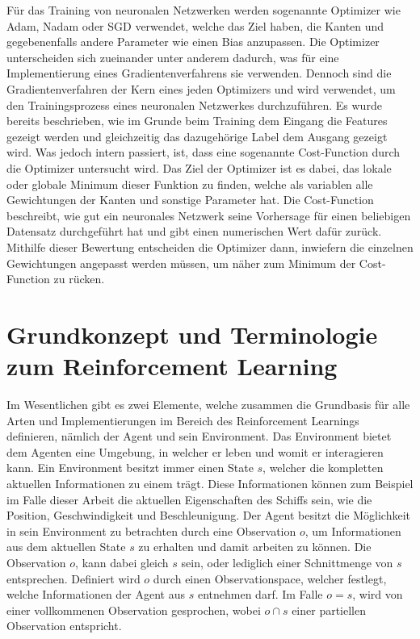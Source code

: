 \documentclass[]{iat}
\begin{document}
Für das Training von neuronalen Netzwerken werden sogenannte Optimizer wie Adam, Nadam oder SGD verwendet, welche das Ziel haben, die Kanten und gegebenenfalls andere Parameter wie einen Bias anzupassen. Die Optimizer unterscheiden sich zueinander unter anderem dadurch, was für eine Implementierung eines Gradientenverfahrens sie verwenden. Dennoch sind die Gradientenverfahren der Kern eines jeden Optimizers und wird verwendet, um den Trainingsprozess eines neuronalen Netzwerkes durchzuführen. Es wurde bereits beschrieben, wie im Grunde beim Training dem Eingang die Features gezeigt werden und gleichzeitig das dazugehörige Label dem Ausgang gezeigt wird. Was jedoch intern passiert, ist, dass eine sogenannte Cost-Function durch die Optimizer untersucht wird. Das Ziel der Optimizer ist es dabei, das lokale oder globale Minimum dieser Funktion zu finden, welche als variablen alle Gewichtungen der Kanten und sonstige Parameter hat. Die Cost-Function beschreibt, wie gut ein neuronales Netzwerk seine Vorhersage für einen beliebigen Datensatz durchgeführt hat und gibt einen numerischen Wert dafür zurück. Mithilfe dieser Bewertung entscheiden die Optimizer dann, inwiefern die einzelnen Gewichtungen angepasst werden müssen, um näher zum Minimum der Cost-Function zu rücken. \cite[]{KrusComp2015}

\newpage
\section{Grundkonzept und Terminologie zum Reinforcement Learning} \label{sec:grundkonzept_rf}
Im Wesentlichen gibt es zwei Elemente, welche zusammen die Grundbasis für alle Arten und Implementierungen im Bereich des Reinforcement Learnings definieren, nämlich der Agent und sein Environment. Das Environment bietet dem Agenten eine Umgebung, in welcher er leben und womit er interagieren kann. Ein Environment besitzt immer einen State $s$, welcher die kompletten aktuellen Informationen zu einem trägt. Diese Informationen können zum Beispiel im Falle dieser Arbeit die aktuellen Eigenschaften des Schiffs sein, wie die Position, Geschwindigkeit und Beschleunigung. Der Agent besitzt die Möglichkeit in sein Environment zu betrachten durch eine Observation $o$, um Informationen aus dem aktuellen State $s$ zu erhalten und damit arbeiten zu können. Die Observation $o$, kann dabei gleich $s$ sein, oder lediglich einer Schnittmenge von $s$ entsprechen. Definiert wird $o$ durch einen Observationspace, welcher festlegt, welche Informationen der Agent aus $s$ entnehmen darf. Im Falle $o=s$, wird von einer vollkommenen Observation gesprochen, wobei $o \cap s$ einer partiellen Observation entspricht. \cite[]{SpinningUp2018} \cite[]{Sutton1998}
\end{document}
